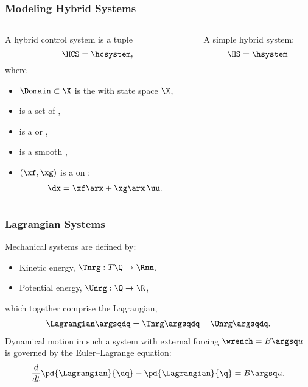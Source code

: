 \begin{frame}[t]
  \frametitle{Modeling Hybrid Systems}
  \begin{columns}
    \begin{column}{.63\textwidth}
      \begin{definition}
        A \alert{hybrid control system} is a tuple \vspace{-.3cm}
        $$\HCS = \hcsystem, \vspace{-.4cm}$$
        where
        \begin{itemize}
        \item
          $\Domain \subset \X$ is the  with state space $\X$,
        \item
          \ControlSet is a set of ,
        \item
          \Guard is a  or ,
        \item
          \ResetMap is a smooth ,
        \item
          $(\xf, \xg)$ is a  on \Domain: \vspace{-3mm}
          \begin{align*}
            \dx = \xf\arx + \xg\arx \, \uu.
          \end{align*}
        \end{itemize}
      \end{definition}
    \end{column}
    \begin{column}{.4\textwidth}
      \begin{figure}    
        \centering
        \def\svgwidth{.8\columnwidth}
        
      \end{figure}
      \vspace{-1em}
      A \alert{simple hybrid system}:\vspace{-.5em}
      $$\HS = \hsystem$$
    \end{column}
  \end{columns}
\end{frame}

\begin{frame}[t]
  \frametitle{Lagrangian Systems}
  Mechanical systems are defined by:
  \begin{itemize}
  \item Kinetic energy, $\Tnrg : T\Q \to \Rnn$,\\
  \item Potential energy, $\Unrg : \Q \to \R$,
  \end{itemize}
  which together comprise the Lagrangian,
  \begin{align*}
    \Lagrangian\argsqdq = \Tnrg\argsqdq - \Unrg\argsqdq.
  \end{align*}
  Dynamical motion in such a system with external forcing $\wrench = B\argsq u$ is governed by the Euler--Lagrange equation:
  \begin{align*}
    \frac{d}{dt} \pd{\Lagrangian}{\dq} - \pd{\Lagrangian}{\q} = B\argsq u.
  \end{align*}
\end{frame}

